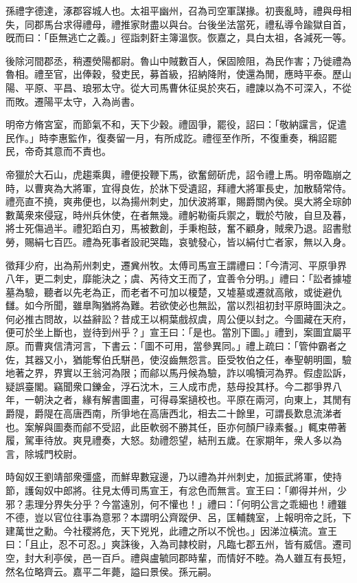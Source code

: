 
\begin{pinyinscope}
孫禮字德達，涿郡容城人也。太祖平幽州，召為司空軍謀掾。初喪亂時，禮與母相失，同郡馬台求得禮母，禮推家財盡以與台。台後坐法當死，禮私導令踰獄自首，旣而曰：「臣無逃亡之義。」徑詣刺姧主簿溫恢。恢嘉之，具白太祖，各減死一等。

後除河間郡丞，稍遷熒陽都尉。魯山中賊數百人，保固險阻，為民作害；乃徙禮為魯相。禮至官，出俸穀，發吏民，募首級，招納降附，使還為閒，應時平泰。歷山陽、平原、平昌、琅邪太守。從大司馬曹休征吳於夾石，禮諫以為不可深入，不從而敗。遷陽平太守，入為尚書。

明帝方脩宮室，而節氣不和，天下少穀。禮固爭，罷役，詔曰：「敬納讜言，促遣民作。」時李惠監作，復奏留一月，有所成訖。禮徑至作所，不復重奏，稱詔罷民，帝奇其意而不責也。

帝獵於大石山，虎趨乘輿，禮便投鞭下馬，欲奮劒斫虎，詔令禮上馬。明帝臨崩之時，以曹爽為大將軍，宜得良佐，於牀下受遺詔，拜禮大將軍長史，加散騎常侍。禮亮直不撓，爽弗便也，以為揚州刺史，加伏波將軍，賜爵關內侯。吳大將全琮帥數萬衆來侵寇，時州兵休使，在者無幾。禮躬勒衞兵禦之，戰於芍陂，自旦及暮，將士死傷過半。禮犯蹈白刃，馬被數創，手秉枹鼓，奮不顧身，賊衆乃退。詔書慰勞，賜絹七百匹。禮為死事者設祀哭臨，哀號發心，皆以絹付亡者家，無以入身。

徵拜少府，出為荊州刺史，遷兾州牧。太傅司馬宣王謂禮曰：「今清河、平原爭界八年，更二刺史，靡能決之；虞、芮待文王而了，宜善令分明。」禮曰：「訟者據墟墓為驗，聽者以先老為正，而老者不可加以榎楚，又墟墓或遷就高敞，或徙避仇讎。如今所聞，雖臯陶猶將為難。若欲使必也無訟，當以烈祖初封平原時圖決之。何必推古問故，以益辭訟？昔成王以桐葉戲叔虞，周公便以封之。今圖藏在天府，便可於坐上斷也，豈待到州乎？」宣王曰：「是也。當別下圖。」禮到，案圖宜屬平原。而曹爽信清河言，下書云：「圖不可用，當參異同。」禮上疏曰：「管仲霸者之佐，其器又小，猶能奪伯氏駢邑，使沒齒無怨言。臣受牧伯之任，奉聖朝明圖，驗地著之界，界實以王翁河為限；而鄃以馬丹候為驗，詐以鳴犢河為界。假虛訟訴，疑誤臺閣。竊聞衆口鑠金，浮石沈木，三人成巿虎，慈母投其杼。今二郡爭界八年，一朝決之者，緣有解書圖畫，可得尋案擿校也。平原在兩河，向東上，其閒有爵隄，爵隄在高唐西南，所爭地在高唐西北，相去二十餘里，可謂長歎息流涕者也。案解與圖奏而鄃不受詔，此臣軟弱不勝其任，臣亦何顏尸祿素餐。」輒束帶著履，駕車待放。爽見禮奏，大怒。劾禮怨望，結刑五歲。在家期年，衆人多以為言，除城門校尉。

時匈奴王劉靖部衆彊盛，而鮮卑數寇邊，乃以禮為并州刺史，加振武將軍，使持節，護匈奴中郎將。往見太傅司馬宣王，有忿色而無言。宣王曰：「卿得并州，少邪？恚理分界失分乎？今當遠別，何不懽也！」禮曰：「何明公言之乖細也！禮雖不德，豈以官位往事為意邪？本謂明公齊蹤伊、呂，匡輔魏室，上報明帝之託，下建萬世之勳。今社稷將危，天下兇兇，此禮之所以不恱也。」因涕泣橫流。宣王曰：「且止，忍不可忍。」爽誅後，入為司隷校尉，凡臨七郡五州，皆有威信。遷司空，封大利亭侯，邑一百戶。禮與盧毓同郡時輩，而情好不睦。為人雖互有長短，然名位略齊云。嘉平二年薨，謚曰景侯。孫元嗣。


\end{pinyinscope}